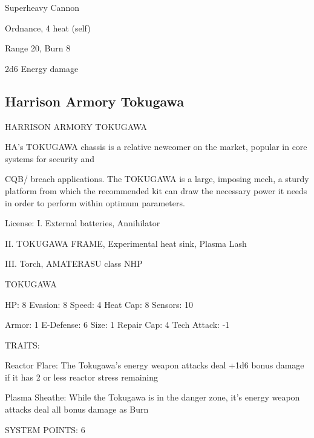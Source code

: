 Superheavy Cannon
 
Ordnance, 4 heat (self)
 
Range 20, Burn 8
 
2d6 Energy damage
 

                                                                                                              
                                                                                                             
\subsection{Harrison Armory Tokugawa}

                             HARRISON ARMORY TOKUGAWA  

HA’s TOKUGAWA chassis is a relative newcomer on the market, popular in core systems for security and  

CQB/ breach applications. The TOKUGAWA is a large, imposing mech, a sturdy platform from which the  
recommended kit can draw the necessary power it needs in order to perform within optimum parameters.   

                                                  License:  
I. External batteries, Annihilator
 
II. TOKUGAWA FRAME, Experimental heat sink, Plasma Lash
 
III. Torch, AMATERASU class NHP
 

                                                                                                          


                                                    TOKUGAWA 

  HP: 8            Evasion: 8                              Speed: 4             Heat Cap: 8         Sensors: 10 

  Armor: 1         E-Defense: 6                            Size: 1              Repair Cap: 4       Tech Attack: -1 

                                                        TRAITS: 

  Reactor Flare: The Tokugawa’s energy weapon attacks deal +1d6 bonus damage if it has 2 or less  
  reactor stress remaining
 
  Plasma Sheathe: While the Tokugawa is in the danger zone, it’s energy weapon attacks deal all bonus  
  damage as Burn 

                                                 SYSTEM POINTS: 6 

